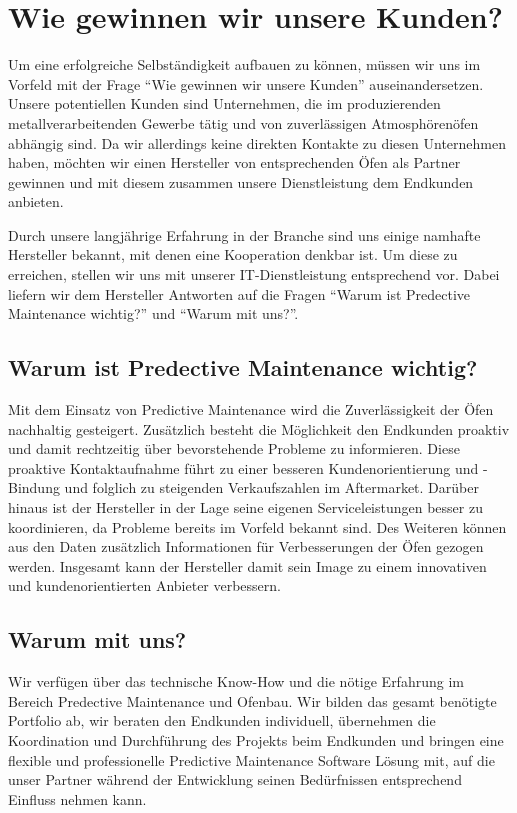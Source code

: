 \section{Wie gewinnen wir unsere Kunden?}
Um eine erfolgreiche Selbständigkeit aufbauen zu können, müssen wir uns im Vorfeld mit der Frage “Wie gewinnen wir unsere Kunden” auseinandersetzen.
Unsere potentiellen Kunden sind Unternehmen, die im produzierenden metallverarbeitenden Gewerbe tätig und von zuverlässigen Atmosphörenöfen abhängig sind. Da wir allerdings keine direkten Kontakte zu diesen Unternehmen haben, möchten wir einen Hersteller von entsprechenden Öfen als Partner gewinnen und mit diesem zusammen unsere Dienstleistung dem Endkunden anbieten.

Durch unsere langjährige Erfahrung in der Branche sind uns einige namhafte Hersteller bekannt, mit denen eine Kooperation denkbar ist. Um diese zu erreichen, stellen wir uns mit unserer IT-Dienstleistung entsprechend vor. Dabei liefern wir dem Hersteller Antworten auf die Fragen “Warum ist Predective Maintenance wichtig?” und “Warum mit uns?”.

\subsection{Warum ist Predective Maintenance wichtig?}
Mit dem Einsatz von Predictive Maintenance wird die Zuverlässigkeit der Öfen nachhaltig gesteigert. Zusätzlich besteht die Möglichkeit den Endkunden proaktiv und damit rechtzeitig über bevorstehende Probleme zu informieren. Diese proaktive Kontaktaufnahme führt zu einer besseren Kundenorientierung und -Bindung und folglich zu steigenden Verkaufszahlen im Aftermarket. Darüber hinaus ist der Hersteller in der Lage seine eigenen Serviceleistungen besser zu koordinieren, da Probleme bereits im Vorfeld bekannt sind. Des Weiteren können aus den Daten zusätzlich Informationen für Verbesserungen der Öfen gezogen werden.
Insgesamt kann der Hersteller damit sein Image zu einem innovativen und kundenorientierten Anbieter verbessern.

\subsection{Warum mit uns?}
Wir verfügen über das technische Know-How und die nötige Erfahrung im Bereich Predective Maintenance und Ofenbau. Wir bilden das gesamt benötigte Portfolio ab, wir beraten den Endkunden individuell, übernehmen die Koordination und Durchführung des Projekts beim Endkunden und bringen eine flexible und professionelle Predictive Maintenance Software Lösung mit, auf die unser Partner während der Entwicklung seinen Bedürfnissen entsprechend Einfluss nehmen kann. 

